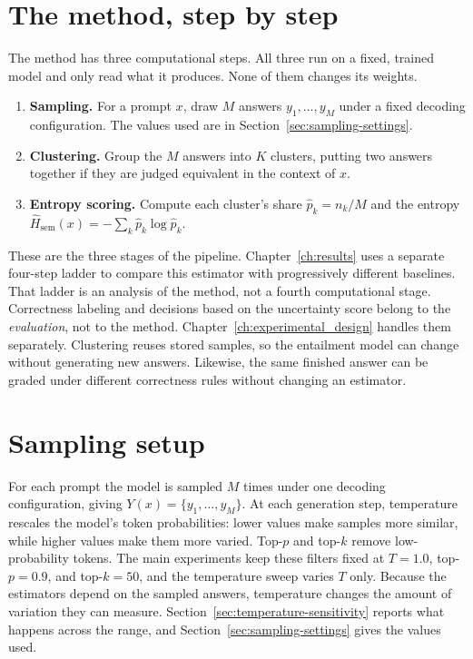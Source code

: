 \section{The method, step by step}
\label{sec:method-steps}

The method has three computational steps. All three run on a fixed, trained
model and only read what it produces. None of them changes its weights.

\begin{enumerate}
  \item \textbf{Sampling.} For a prompt $x$, draw $M$ answers
        $y_1,\ldots,y_M$ under a fixed decoding configuration. The values used
        are in Section~\ref{sec:sampling-settings}.
  \item \textbf{Clustering.} Group the $M$ answers into $K$ clusters, putting
        two answers together if they are judged equivalent in the context
        of $x$.
  \item \textbf{Entropy scoring.} Compute each cluster's share
        $\hat{p}_k=n_k/M$ and the entropy
        $\widehat{H}_{\mathrm{sem}}(x)=-\sum_k \hat{p}_k\log\hat{p}_k$.
\end{enumerate}

These are the three stages of the pipeline. Chapter~\ref{ch:results} uses a
separate four-step ladder to compare this estimator with progressively different
baselines. That ladder is an analysis of the method, not a fourth computational
stage. Correctness labeling and decisions based on the uncertainty score belong to the
\emph{evaluation}, not to the method. Chapter~\ref{ch:experimental_design}
handles them separately. Clustering reuses stored samples, so the entailment
model can change without generating new answers. Likewise, the same finished
answer can be graded under different correctness rules without changing an
estimator.

\section{Sampling setup}
\label{sec:sampling-setup}

For each prompt the model is sampled $M$ times under one decoding
configuration, giving $Y(x) = \{y_1,\ldots,y_M\}$. At each generation step,
temperature rescales the model's token probabilities: lower values make
samples more similar, while higher values make them more varied. Top-$p$ and
top-$k$ remove low-probability tokens. The main experiments keep these filters
fixed at $T=1.0$, top-$p=0.9$, and top-$k=50$, and the temperature sweep varies
$T$ only. Because the estimators depend on the sampled answers, temperature
changes the amount of variation they can measure.
Section~\ref{sec:temperature-sensitivity} reports what happens across the
range, and Section~\ref{sec:sampling-settings} gives the values used.

